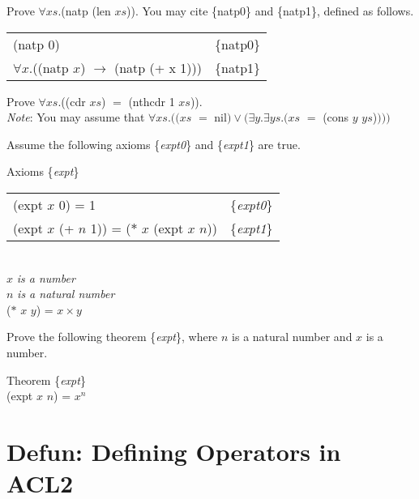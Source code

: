 \begin{ExerciseList}

\Exercise Prove $\forall xs.$(natp (len $xs$)).
You may cite \{natp0\} and \{natp1\}, defined as follows.
\begin{center}
\begin{tabular}{ll}
(natp $0$)                                            & \{natp0\}\\
$\forall x.$((natp $x$) $\rightarrow$ (natp (+ x 1))) & \{natp1\}\\
\end{tabular}
\end{center}

\Exercise Prove $\forall xs.$((cdr $xs$) $=$ (nthcdr 1 $xs$)).\\
\emph{Note}: You may assume that $\forall xs.((xs$ $=$ nil$) \vee (\exists y.\exists ys.(xs$ $=$ (cons $y$ $ys$)$)))$

\Exercise Assume the following axioms \{\emph{expt0}\} and \{\emph{expt1}\} are true.
\begin{samepage}
\label{expt-equations}
\begin{center}
Axioms \{\emph{expt}\} \\
\begin{tabular}{ll}
(expt $x$ 0) = 1                                & \{\emph{expt0}\} \\
(expt $x$ (+ $n$ 1)) = ($*$ $x$ (expt $x$ $n$)) & \{\emph{expt1}\} \\
\hline
\end{tabular}
\\ $x$ \emph{is a number}
\\ $n$ \emph{is a natural number}
\\ ($*$ $x$ $y$) = $x \times y$
\end{center}
\end{samepage}
Prove the following theorem \{\emph{expt}\}, where $n$ is a natural number and $x$ is a number.
\begin{samepage}
\label{expt-thm}
\begin{center}
Theorem \{\emph{expt}\} \\
(expt $x$ $n$) = $x^n$
\end{center}
\end{samepage}

\end{ExerciseList}

\section{Defun: Defining Operators in ACL2}
\label{sec:defun}

